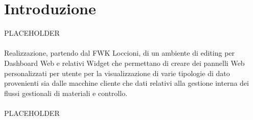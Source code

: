\chapter{Introduzione}
\label{chap:intro}

PLACEHOLDER \\\\
Realizzazione, partendo dal FWK Loccioni, di un ambiente di editing per Dashboard Web e relativi Widget che permettano di creare dei pannelli Web personalizzati per utente per la visualizzazione di varie tipologie di dato provenienti sia dalle macchine cliente che dati relativi alla gestione interna dei flussi gestionali di materiali e controllo. 
\\\\ PLACEHOLDER
